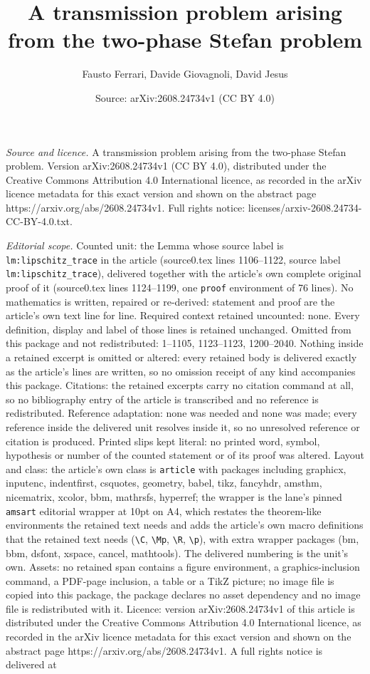 \documentclass[10pt,a4paper]{amsart}
\title[A transmission problem arising from the two-phase Stefan pro]{A transmission problem arising from the two-phase Stefan problem}
\author{Fausto Ferrari, Davide Giovagnoli, David Jesus}
\date{Source: arXiv:2608.24734v1 (CC BY 4.0)}
\begin{document}
\maketitle

\noindent\emph{Source and licence.} A transmission problem arising from the two-phase Stefan problem. Version arXiv:2608.24734v1 (CC BY 4.0), distributed under the Creative Commons Attribution 4.0 International licence, as recorded in the arXiv licence metadata for this exact version and shown on the abstract page https://arxiv.org/abs/2608.24734v1. Full rights notice: licenses/arxiv-2608.24734-CC-BY-4.0.txt.\par\smallskip

\noindent\textit{Editorial scope.} Counted unit: the Lemma whose source label is \texttt{lm:lipschitz\_trace} in the article (source0.tex lines 1106--1122, source label \texttt{lm:lipschitz\_trace}), delivered together with the article's own complete original proof of it (source0.tex lines 1124--1199, one \texttt{proof} environment of 76 lines). No mathematics is written, repaired or re-derived: statement and proof are the article's own text line for line. Required context retained uncounted: none. Every definition, display and label of those lines is retained unchanged. Omitted from this package and not redistributed: 1--1105, 1123--1123, 1200--2040. Nothing inside a retained excerpt is omitted or altered: every retained body is delivered exactly as the article's lines are written, so no omission receipt of any kind accompanies this package. Citations: the retained excerpts carry no citation command at all, so no bibliography entry of the article is transcribed and no reference is redistributed. Reference adaptation: none was needed and none was made; every reference inside the delivered unit resolves inside it, so no unresolved reference or citation is produced. Printed slips kept literal: no printed word, symbol, hypothesis or number of the counted statement or of its proof was altered. Layout and class: the article's own class is \texttt{article} with packages including graphicx, inputenc, indentfirst, csquotes, geometry, babel, tikz, fancyhdr, amsthm, nicematrix, xcolor, bbm, mathrsfs, hyperref; the wrapper is the lane's pinned \texttt{amsart} editorial wrapper at 10pt on A4, which restates the theorem-like environments the retained text needs and adds the article's own macro definitions that the retained text needs (\texttt{\textbackslash C}, \texttt{\textbackslash Mp}, \texttt{\textbackslash R}, \texttt{\textbackslash p}), with extra wrapper packages (bm, bbm, dsfont, xspace, cancel, mathtools). The delivered numbering is the unit's own. Assets: no retained span contains a figure environment, a graphics-inclusion command, a PDF-page inclusion, a table or a TikZ picture; no image file is copied into this package, the package declares no asset dependency and no image file is redistributed with it. Licence: version arXiv:2608.24734v1 of this article is distributed under the Creative Commons Attribution 4.0 International licence, as recorded in the arXiv licence metadata for this exact version and shown on the abstract page https://arxiv.org/abs/2608.24734v1. A full rights notice is delivered at 
\end{document}
